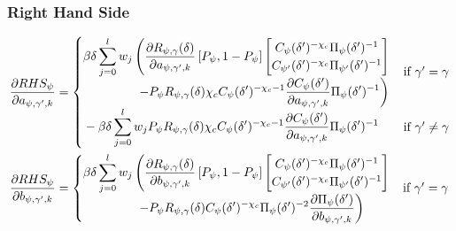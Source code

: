 \documentclass[11pt]{article}
\begin{document}
\subsubsection*{Right Hand Side}
\begin{align}
\frac{\partial RHS_{\psi}}{\partial a_{\psi,\gamma',k}} &= 
\begin{cases}
\begin{aligned}
&\beta\delta\sum_{j = 0}^{l}w_j\left(\frac{\partial R_{\psi,\gamma}(\delta)}{\partial a_{\psi,\gamma',k}}\left[P_{\psi}, 1-P_{\psi}\right]
\begin{bmatrix}
C_{\psi}(\delta')^{-\chi_{c}}\Pi_{\psi}(\delta')^{-1}\\
C_{\psi'}(\delta')^{-\chi_{c}}\Pi_{\psi'}(\delta')^{-1}
\end{bmatrix} \right.\\
& \hspace{1.5cm}\left.- P_{\psi}R_{\psi,\gamma}(\delta)\chi_{c}C_{\psi}(\delta')^{-\chi_{c}-1}\frac{\partial C_{\psi}(\delta')}{\partial a_{\psi,\gamma',k}}\Pi_{\psi}(\delta')^{-1}\right)
\end{aligned} & \text{if } \gamma' = \gamma \\
\begin{aligned}
&-\beta\delta\sum_{j = 0}^{l}w_j P_{\psi}R_{\psi,\gamma}(\delta)\chi_{c}C_{\psi}(\delta')^{-\chi_{c}-1}\frac{\partial C_{\psi}(\delta')}{\partial a_{\psi,\gamma',k}}\Pi_{\psi}(\delta')^{-1}
\end{aligned} & \text{if } \gamma' \neq \gamma 
\end{cases}\\
\frac{\partial RHS_{\psi}}{\partial b_{\psi,\gamma',k}} &= 
\begin{cases}
\begin{aligned}
&\beta\delta\sum_{j = 0}^{l}w_j\left(\frac{\partial R_{\psi,\gamma}(\delta)}{\partial b_{\psi,\gamma',k}}\left[P_{\psi}, 1-P_{\psi}\right]
\begin{bmatrix}
C_{\psi}(\delta')^{-\chi_{c}}\Pi_{\psi}(\delta')^{-1}\\
C_{\psi'}(\delta')^{-\chi_{c}}\Pi_{\psi'}(\delta')^{-1}
\end{bmatrix} \right.\\
& \hspace{1.5cm}\left.- P_{\psi}R_{\psi,\gamma}(\delta)C_{\psi}(\delta')^{-\chi_{c}}\Pi_{\psi}(\delta')^{-2}\frac{\partial \Pi_{\psi}(\delta')}{\partial b_{\psi,\gamma',k}}\right)
\end{aligned} & \text{if } \gamma' = \gamma \\

\end{cases}
\end{align}
\end{document}
